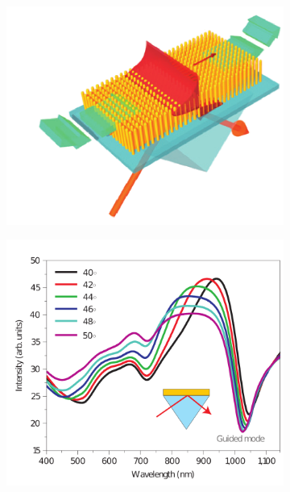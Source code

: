 	\begin{figure}[h!]\centering
		\begin{subfigure}{.01\linewidth}\caption{ }\label{sfig:Nanocilindros} \vspace{5cm}	\end{subfigure}  
		\begin{subfigure}{.45\linewidth}\hspace*{-3em}\includegraphics[scale=1]{0-4-Introduccion/figs/nanorods.png}\end{subfigure}
\begin{subfigure}{.01\linewidth}\caption{ }\label{sfig:DipATR}\vspace{4.75cm}\end{subfigure}  
		\begin{subfigure}{.45\linewidth}\hspace*{-1em}\includegraphics[scale=.9]{0-4-Introduccion/figs/reflectancia.png}\end{subfigure}\\

\end{figure}
